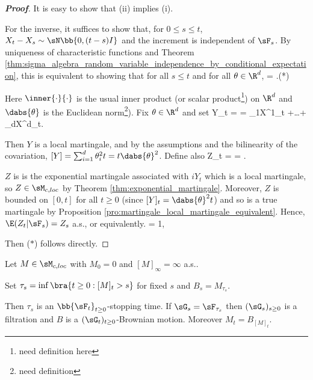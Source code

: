 \begin{proof}[\bf Proof]
It is easy to show that (ii) implies (i).

For the inverse, it suffices to show that, for $0 \leq s \leq t$, $X_t - X_s \sim \sN\bb{0, (t - s)I}$ and the increment is independent of $\sF_s$. By uniqueness of characteristic functions and Theorem \ref{thm:sigma_algebra_random_variable_independence_by_conditional_expectation}, this is equivalent to showing that for all $s \leq t$ and for all $\theta \in \R^d$,
\be%
\E{} = \exp{}.\quad (*)
\ee

Here $\inner{\cdot}{\cdot}$ is the usual inner product (or scalar product\footnote{need definition here}) on $\R^d$ and $\dabs{\theta}$ is the Euclidean norm\footnote{need definition}). Fix $\theta\in \R^d$ and set
\be
Y_t =  = \theta_1X^1_t +\dots+ \theta_dX^d_t.
\ee

Then $Y$ is a local martingale, and by the assumptions and the bilinearity of the covariation, $[Y ] = \sum^d_{i=1} \theta^2_i t = t\dabs{\theta}^2$. Define also
\be
Z_t = \exp{} = \exp{}.
\ee

$Z$ is is the exponential martingale associated with $iY_t$ which is a local martingale, so $Z \in \sM_{c,loc}$ by Theorem \ref{thm:exponential_martingale}. Moreover, $Z$ is bounded on $[0, t]$ for all $t \geq 0$ (since $[Y ]_t = \dabs{\theta}^2 t$) and so is a true martingale by Proposition \ref{pro:martingale_local_martingale_equivalent}. Hence, $\E(Z_t|\sF_s) = Z_s$ a.s., or equivalently.
\be
\E{} = 1,\quad{}
\ee

Then ($*$) follows directly.
\end{proof}


\begin{theorem}\label{thm:dubins_schwarz}
Let $M \in \sM_{c,loc}$ with $M_0 = 0$ and $[M]_\infty = \infty$ a.s..

Set $\tau_s = \inf\bra{t \geq 0 : [M]_t > s}$ for fixed $s$ and $B_s = M_{\tau_s}$.

Then $\tau_s$ is an $\bb{\sF_t}_{t\geq0}$-stopping time. If $\sG_s = \sF_{\tau_s}$ then $(\sG_s)_{s\geq0}$ is a filtration and $B$ is a $(\sG_t)_{t\geq0}$-Brownian motion. Moreover $M_t =
B_{[M]_t}$.
\end{theorem}

